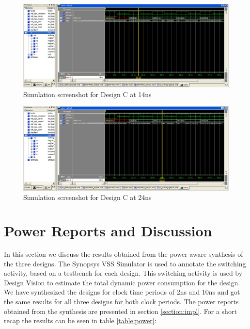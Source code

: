 \documentclass[11pt,a4paper]{article}
\begin{document}
\begin{figure}[htp]
\centering
\includegraphics[length = 4in,width = 6.5in]{./images/simsrg1.png}
\caption{Simulation screenshot for Design C at 14ns}
\end{figure}

\begin{figure}[htp]
\centering
\includegraphics[length = 4in,width = 6.5in]{./images/simsrg2.png}
\caption{Simulation screenshot for Design C at 24ns}
\end{figure}

\newpage
\section{Power Reports and Discussion}
\label{section:power}

In this section we discuss the results obtained from the power-aware synthesis of the three designs. The Synopsys VSS Simulator is used to annotate the switching activity, based on a testbench for each design. This switching activity is used by Design Vision to estimate the total dynamic power consumption for the design. We have synthesized the designs for clock time periods of 2ns and 10ns and got the same results for all three designs for both clock periods. The power reports obtained from the synthesis are presented in section \ref{section:impl}. For a short recap the results can be seen in table \ref{table:power}:
\end{document}
